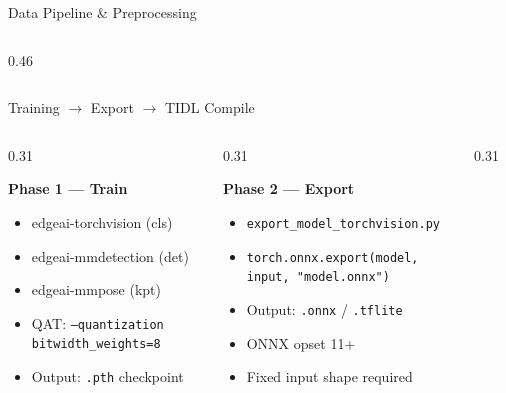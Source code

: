 \documentclass[aspectratio=169,12pt]{beamer}
\begin{document}
\begin{frame}{Data Pipeline \& Preprocessing}
\begin{columns}[T]
\begin{column}{0.46\textwidth}
    \end{column}
  \end{columns}
\end{frame}

\begin{frame}{Training $\to$ Export $\to$ TIDL Compile}
  \begin{columns}[T]
    \begin{column}{0.31\textwidth}
      \begin{block}{\textcolor{TIBlue}{\textbf{Phase 1 — Train}}}
        \begin{itemize}\scriptsize
          \item edgeai-torchvision (cls)
          \item edgeai-mmdetection (det)
          \item edgeai-mmpose (kpt)
          \item QAT: \texttt{--quantization}\\
                \texttt{bitwidth\_weights=8}
          \item Output: \texttt{.pth} checkpoint
        \end{itemize}
      \end{block}
    \end{column}
    \begin{column}{0.31\textwidth}
      \begin{block}{\textcolor{TIOrange}{\textbf{Phase 2 — Export}}}
        \begin{itemize}\scriptsize
          \item \texttt{export\_model\_torchvision.py}
          \item \texttt{torch.onnx.export(model,}\\
                \texttt{\quad input, "model.onnx")}
          \item Output: \texttt{.onnx} / \texttt{.tflite}
          \item ONNX opset 11+
          \item Fixed input shape required
        \end{itemize}
      \end{block}
    \end{column}
    \begin{column}{0.31\textwidth}

\end{column}
\end{columns}
\end{frame}
\end{document}
